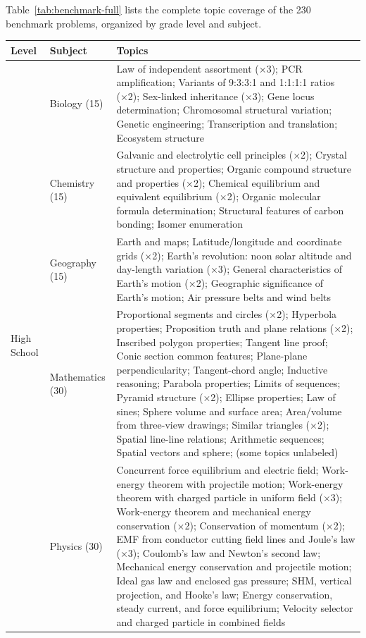 \documentclass[11pt]{article}
\begin{document}
Table~\ref{tab:benchmark-full} lists the complete topic coverage of the 230 benchmark problems, organized by grade level and subject.

\begin{table}[!ht]
\centering
\small
\begin{tabular}{llp{10cm}}
\hline
\textbf{Level} & \textbf{Subject} & \textbf{Topics} \\
\hline
\multirow{5}{*}{High School}
 & Biology (15)
 & Law of independent assortment (×3); PCR amplification; Variants of 9:3:3:1 and 1:1:1:1 ratios (×2); Sex-linked inheritance (×3); Gene locus determination; Chromosomal structural variation; Genetic engineering; Transcription and translation; Ecosystem structure \\
\cline{2-3}
 & Chemistry (15)
 & Galvanic and electrolytic cell principles (×2); Crystal structure and properties; Organic compound structure and properties (×2); Chemical equilibrium and equivalent equilibrium (×2); Organic molecular formula determination; Structural features of carbon bonding; Isomer enumeration \\
\cline{2-3}
 & Geography (15)
 & Earth and maps; Latitude/longitude and coordinate grids (×2); Earth's revolution: noon solar altitude and day-length variation (×3); General characteristics of Earth's motion (×2); Geographic significance of Earth's motion; Air pressure belts and wind belts \\
\cline{2-3}
 & Mathematics (30)
 & Proportional segments and circles (×2); Hyperbola properties; Proposition truth and plane relations (×2); Inscribed polygon properties; Tangent line proof; Conic section common features; Plane-plane perpendicularity; Tangent-chord angle; Inductive reasoning; Parabola properties; Limits of sequences; Pyramid structure (×2); Ellipse properties; Law of sines; Sphere volume and surface area; Area/volume from three-view drawings; Similar triangles (×2); Spatial line-line relations; Arithmetic sequences; Spatial vectors and sphere; (some topics unlabeled) \\
\cline{2-3}
 & Physics (30)
 & Concurrent force equilibrium and electric field; Work-energy theorem with projectile motion; Work-energy theorem with charged particle in uniform field (×3); Work-energy theorem and mechanical energy conservation (×2); Conservation of momentum (×2); EMF from conductor cutting field lines and Joule's law (×3); Coulomb's law and Newton's second law; Mechanical energy conservation and projectile motion; Ideal gas law and enclosed gas pressure; SHM, vertical projection, and Hooke's law; Energy conservation, steady current, and force equilibrium; Velocity selector and charged particle in combined fields \\

\end{tabular}
\end{table}
\end{document}

